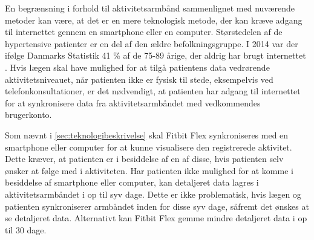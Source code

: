 En begrænsning i forhold til aktivitetsarmbånd sammenlignet med nuværende metoder kan være, at det er en mere teknologisk metode, der kan kræve adgang til internettet gennem en smartphone eller en computer. Størstedelen af de hypertensive patienter er en del af den ældre befolkningsgruppe. I 2014 var der ifølge Danmarks Statistik 41 \% af de 75-89 årige, der aldrig har brugt internettet \citep{dst2014}. Hvis lægen skal have mulighed for at tilgå patientens data vedrørende aktivitetsniveauet, når patienten ikke er fysisk til stede, eksempelvis ved telefonkonsultationer, er det nødvendigt, at patienten har adgang til internettet for at synkronisere data fra aktivitetsarmbåndet med vedkommendes brugerkonto.

Som nævnt i \autoref{sec:teknologibeskrivelse} skal Fitbit Flex synkroniseres med en smartphone eller computer for at kunne visualisere den registrerede aktivitet. Dette kræver, at patienten er i besiddelse af en af disse, hvis patienten selv ønsker at følge med i aktiviteten. Har patienten ikke mulighed for at komme i besiddelse af smartphone eller computer, kan detaljeret data lagres i aktivitetsarmbåndet i op til syv dage. Dette er ikke problematisk, hvis lægen og patienten synkroniserer armbåndet inden for disse syv dage, såfremt det ønskes at se detaljeret data. Alternativt kan Fitbit Flex gemme mindre detaljeret data i op til 30 dage. 
